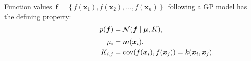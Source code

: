 \documentclass[portrait,a1,final]{a0poster} %
\let\tempone\itemize
\let\temptwo\enditemize
\renewenvironment{itemize}{\tempone\addtolength{\itemsep}{-0.3\baselineskip}}{\temptwo}
\def\figpdfdir{fig/} %
\DeclareMathOperator{\cov}{cov}
\begin{document}
\begin{minipage}{1\linewidth}
\begin{minipage}[t]{0.48\linewidth}
\begin{itemize}
\item Function values\, $\bm{f}=\left\lbrace  f(\bm{x}_1), f(\bm{x}_2), \hdots, f(\bm{x}_n) \right\rbrace$\, following a GP model has the defining property:
%
\begin{align*}
p(\bm{f}) &= \mathcal{N}(\bm{f} \mid \bm{\mu}, K),\\[1mm]
\mu_i &= m(\bm{x}_i),\\
\hspace{27mm} K_{i,j} &=\cov( f(\bm{x}_i),f(\bm{x}_j))=k(\bm{x}_i,\bm{x}_j).
\end{align*}


%
%



%
%
 


\end{itemize}
\end{minipage}
\end{minipage}
\end{document}
